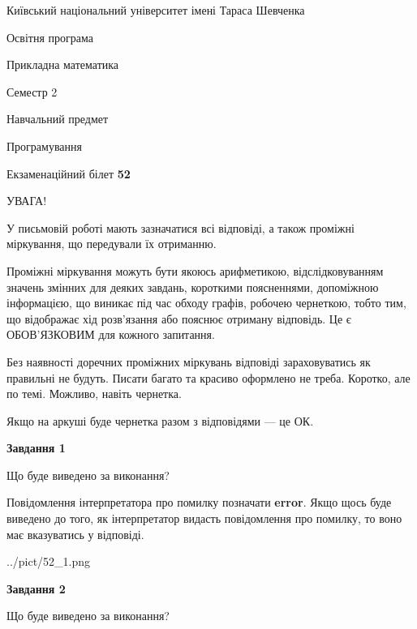 \documentclass[12pt, ukrainian]{article}
\begin{document}
{{\begin {small}\par
{ \center  Київський національний університет імені Тараса Шевченка \par}
{\parbox {5 cm}{Освітня програма \hfill}{\parbox {7 cm}{Прикладна математика \hfill}}\parbox {6 cm}{\hfill Семестр 2}}\par
{\parbox {5 cm} {Навчальний предмет \hfill}\parbox {7 cm}{Програмування \hfill}\parbox {6cm}{\hfill}\par}\vspace{-7pt} \end{small}}{\center Екзаменаційний білет \No \textbf
{ 52 }\par}}
{
\begin {large}
УВАГА!

У письмовій роботі мають зазначатися всі відповіді, а також проміжні міркування, що передували їх отриманню.

Проміжні міркування можуть бути якоюсь арифметикою, відслідковуванням зна\-чень змінних для деяких завдань,
короткими поясненнями, допоміжною інформацією, що виникає під час обходу графів, робочею чернеткою,
тобто тим, що відображає хід розв’язання або пояснює отриману відповідь.
Це є ОБОВ’ЯЗКОВИМ для кожного запитання.

Без наявності доречних проміжних міркувань відповіді зараховуватись як правиль\-ні не будуть.
Писати багато та красиво оформлено не треба. Коротко, але по темі. Можли\-во, навіть чернетка.

Якщо на аркуші буде чернетка разом з відповідями --- це ОК.

\newpage

{\begin {center}\textbf{Завдання 1}\end {center}}\par
Що буде виведено за виконання?

Повідомлення інтерпретатора про помилку позначати \textbf{error}.
Якщо щось буде виведено до того, як інтерпретатор видасть повідомлення про помилку, 
то воно має вказуватись у відповіді. \par


\begin{center}
	{../pict/52_1.png}
\end{center}
\newpage

{\begin {center}\textbf{Завдання 2}\end {center}}\par
Що буде виведено за виконання?


\end{large}}
\end{document}
